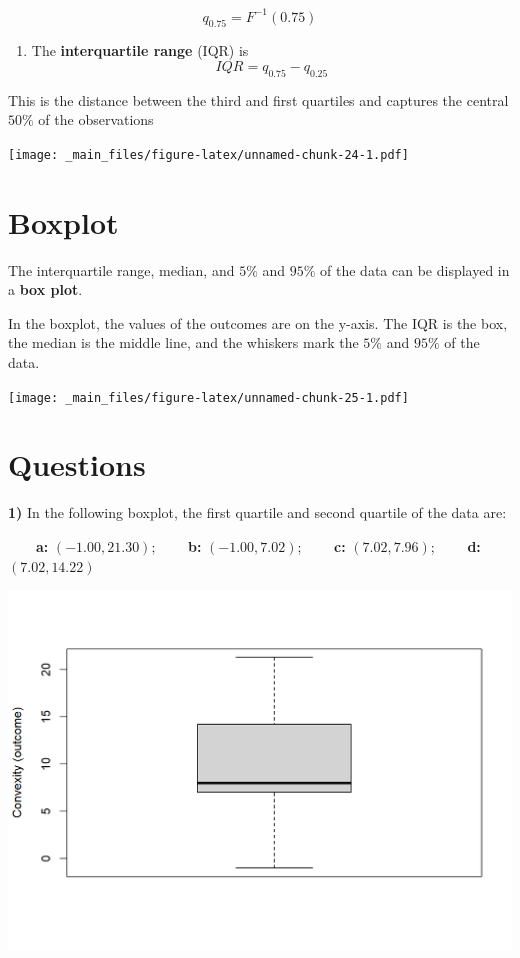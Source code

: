 \documentclass[
]{book}
\providecommand{\tightlist}{%
  \setlength{\itemsep}{0pt}\setlength{\parskip}{0pt}}
\begin{document}
\[q_{0.75}=F^{-1}(0.75)\]

\begin{enumerate}
\def\labelenumi{\arabic{enumi})}
\setcounter{enumi}{2}
\tightlist
\item
  The \textbf{interquartile range} (IQR) is \[IQR=q_{0.75} - q_{0.25}\]
\end{enumerate}

This is the distance between the third and first quartiles and captures the central \(50\%\) of the observations

\texttt{[image: \_main\_files/figure-latex/unnamed-chunk-24-1.pdf]}

\hypertarget{boxplot}{%
\section{Boxplot}\label{boxplot}}

The interquartile range, median, and \(5\%\) and \(95\%\) of the data can be displayed in a \textbf{box plot}.

In the boxplot, the values of the outcomes are on the y-axis. The IQR is the box, the median is the middle line, and the whiskers mark the \(5\%\) and \(95\%\) of the data.

\texttt{[image: \_main\_files/figure-latex/unnamed-chunk-25-1.pdf]}

\hypertarget{questions}{%
\section{Questions}\label{questions}}

\textbf{1)} In the following boxplot, the first quartile and second quartile of the data are:

\textbf{\(\qquad\)a:} \((-1.00, 21.30)\); \textbf{\(\qquad\)b:} \((-1.00, 7.02)\); \textbf{\(\qquad\)c:} \((7.02, 7.96)\); \textbf{\(\qquad\)d:} \((7.02, 14.22)\)

\includegraphics{./figures/box.png}
\end{document}
